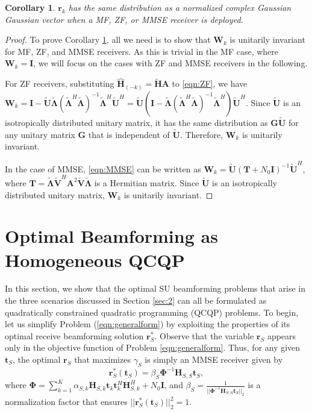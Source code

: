 \documentclass[twocolumn,10pt]{IEEEtran}
\theoremstyle{plain} \newtheorem{theorem}{Theorem}
\theoremstyle{plain} \newtheorem{proposition}{Proposition}
\theoremstyle{plain} \newtheorem{corollary}{Corollary}
\theoremstyle{remark} \newtheorem{remark}{Remark}
\theoremstyle{remark} \newtheorem{lemma}{Lemma}
\theoremstyle{plain} \newtheorem{definition}{Definition}
\theoremstyle{plain} \newtheorem{assumption}{Assumption}
\theoremstyle{plain} \newtheorem{fact}{Fact}
\begin{document}
\begin{corollary} \label{cor:1}
$\mathbf{r}_k$ has the same distribution as a normalized complex Gaussian Gaussian vector when a MF, ZF, or MMSE receiver is deployed.
\end{corollary}
\begin{proof}
To prove Corollary \ref{cor:1},  all we need is to show that  $\mathbf{W}_k$ is unitarily invariant for MF, ZF, and MMSE receivers. As this is trivial in the MF case, where $\mathbf{W}_k=\mathbf{I}$, we will focus on the cases with ZF and MMSE receivers in the following.

For ZF receivers, substituting  $\mathbf{\hat{H}}_{(-k)} =\mathbf{\tilde{H}} \mathbf{A}$ to \eqref{eqn:ZF}, we have $\mathbf{W}_k=\mathbf{I}-\mathbf{\tilde{U}}\mathbf{\tilde{\Lambda}}(\mathbf{\tilde{\Lambda}}^H\mathbf{\tilde{\Lambda}})^{-1}\mathbf{\tilde{\Lambda}}^H\mathbf{\tilde{U}}^H=\mathbf{\tilde{U}}(\mathbf{I}-\mathbf{\tilde{\Lambda}}(\mathbf{\tilde{\Lambda}}^H\mathbf{\tilde{\Lambda}})^{-1}\mathbf{\tilde{\Lambda}}^H)\mathbf{\tilde{U}}^H$. Since $\mathbf{\tilde{U}}$ is an isotropically distributed unitary matrix, it has the same distribution as $\mathbf{G}\mathbf{\tilde{U}}$ for any unitary matrix $\mathbf{G}$ that is independent of $\mathbf{\tilde{U}}$. Therefore, $\mathbf{W}_k$ is unitarily invariant.

In the case of MMSE, \eqref{eqn:MMSE} can be written as $\mathbf{W}_k=\mathbf{\tilde{U}}(\mathbf{T}+N_0\mathbf{I})^{-1}\mathbf{\tilde{U}}^H$, where $\mathbf{T}=\mathbf{\tilde{\Lambda}}\mathbf{\tilde{V}}^H\mathbf{A}^2\mathbf{\tilde{V}}\mathbf{\tilde{\Lambda}}$ is a Hermitian matrix. Since $\mathbf{\tilde{U}}$ is an isotropically distributed unitary matrix, $\mathbf{W}_k$ is unitarily invariant.

\end{proof}


\section{Optimal Beamforming as Homogeneous QCQP}\label{section:3}
In this section, we show that the optimal SU beamforming problems that arise in the three scenarios discussed in Section \ref{sec:2} can all be formulated as quadratically constrained quadratic programming (QCQP) problems.  To begin, let us simplify Problem (\ref{eqn:generalform}) by exploiting the properties of its optimal receive beamforming solution $\mathbf{r}_S^*$.  Observe that the variable $\mathbf{r}_S$ appears only in the objective function of Problem \eqref{eqn:generalform}.  Thus, for any given $\mathbf{t}_S$, the optimal $\mathbf{r}_S$ that maximizes $\gamma_S$ is simply an MMSE receiver \cite{JD93} given by
\begin{equation}\label{eqn:rS}
\mathbf{r}_S^*(\mathbf{t}_S)=\beta_S\mathbf{\Phi}^{-1}\mathbf{H}_{S,S}\mathbf{t}_S,
\end{equation}
where $\mathbf{\Phi}=\sum_{k=1}^K\alpha_{S,k}\mathbf{H}_{S,k}\mathbf{t}_k\mathbf{t}_k^H\mathbf{H}_{S,k}^H+N_0\mathbf{I}$, and $\beta_S=\frac{1}{||\mathbf{\Phi}^{-1}\mathbf{H}_{S,S}\mathbf{t}_S||_2}$ is a normalization factor that ensures $||\mathbf{r}_S^*(\mathbf{t}_S)||_2^2=1$.
\end{document}
